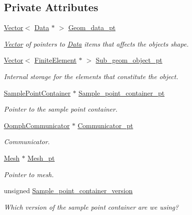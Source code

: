 \subsection*{Private Attributes}
\begin{DoxyCompactItemize}
\item 
\hyperlink{classoomph_1_1Vector}{Vector}$<$ \hyperlink{classoomph_1_1Data}{Data} $\ast$ $>$ \hyperlink{classoomph_1_1MeshAsGeomObject_af99c1c7301530bc8123a1ac7f9739f22}{Geom\+\_\+data\+\_\+pt}
\begin{DoxyCompactList}\small\item\em \hyperlink{classoomph_1_1Vector}{Vector} of pointers to \hyperlink{classoomph_1_1Data}{Data} items that affects the object\textquotesingle{}s shape. \end{DoxyCompactList}\item 
\hyperlink{classoomph_1_1Vector}{Vector}$<$ \hyperlink{classoomph_1_1FiniteElement}{Finite\+Element} $\ast$ $>$ \hyperlink{classoomph_1_1MeshAsGeomObject_a47ec1120aff1d0981ad2217c78056d19}{Sub\+\_\+geom\+\_\+object\+\_\+pt}
\begin{DoxyCompactList}\small\item\em Internal storage for the elements that constitute the object. \end{DoxyCompactList}\item 
\hyperlink{classSamplePointContainer}{Sample\+Point\+Container} $\ast$ \hyperlink{classoomph_1_1MeshAsGeomObject_a1bfccdbb639a9c946a3978a02fbe0585}{Sample\+\_\+point\+\_\+container\+\_\+pt}
\begin{DoxyCompactList}\small\item\em Pointer to the sample point container. \end{DoxyCompactList}\item 
\hyperlink{classoomph_1_1OomphCommunicator}{Oomph\+Communicator} $\ast$ \hyperlink{classoomph_1_1MeshAsGeomObject_a4400446d8dd7ef4d1d6be3ee7491a04f}{Communicator\+\_\+pt}
\begin{DoxyCompactList}\small\item\em Communicator. \end{DoxyCompactList}\item 
\hyperlink{classoomph_1_1Mesh}{Mesh} $\ast$ \hyperlink{classoomph_1_1MeshAsGeomObject_aba2f3c5644e8625d4bd7503c781e2d54}{Mesh\+\_\+pt}
\begin{DoxyCompactList}\small\item\em Pointer to mesh. \end{DoxyCompactList}\item 
unsigned \hyperlink{classoomph_1_1MeshAsGeomObject_a059e99eff4df393b35ae0473788322d6}{Sample\+\_\+point\+\_\+container\+\_\+version}
\begin{DoxyCompactList}\small\item\em Which version of the sample point container are we using? \end{DoxyCompactList}\end{DoxyCompactItemize}

